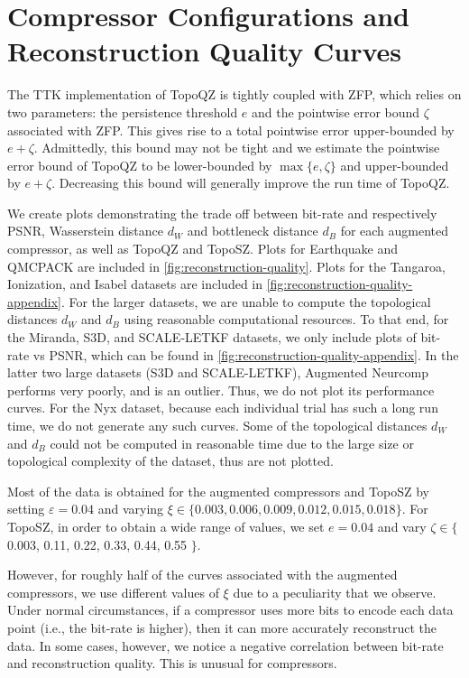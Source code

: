 \section{Compressor Configurations and Reconstruction Quality Curves}
\label{sec:reconstruction-quality-extra}

The TTK implementation of TopoQZ is tightly coupled with ZFP, which relies on two parameters: the persistence threshold $e$ and the pointwise error bound $\zeta$ associated with ZFP. 
This gives rise to a total pointwise error upper-bounded by $e+\zeta$. Admittedly, this bound may not be tight and we estimate the pointwise error bound of TopoQZ to be lower-bounded by $\max\{e, \zeta\}$ and upper-bounded by $e+\zeta$. Decreasing this bound will generally improve the run time of TopoQZ.   

We create plots demonstrating the trade off between bit-rate and respectively PSNR, Wasserstein distance $d_W$ and bottleneck distance $d_B$ for each augmented compressor, as well as TopoQZ and TopoSZ. 
Plots for Earthquake and QMCPACK are included in \cref{fig:reconstruction-quality}. Plots for the Tangaroa, Ionization, and Isabel datasets are included in \cref{fig:reconstruction-quality-appendix}. 
For the larger datasets, we are unable to compute the topological distances $d_W$ and $d_B$ using reasonable computational resources. 
To that end, for the Miranda, S3D, and SCALE-LETKF datasets, we only include plots of bit-rate vs PSNR, which can be found in \cref{fig:reconstruction-quality-appendix}. 
In the latter two large datasets (S3D and SCALE-LETKF), Augmented Neurcomp performs very poorly, and is an outlier. 
Thus, we do not plot its performance curves. 
For the Nyx dataset, because each individual trial has such a long run time, we do not generate any such curves. 
Some of the topological distances $d_W$ and $d_B$ could not be computed in reasonable time due to the large size or topological complexity of the dataset, thus are not plotted.

Most of the data is obtained for the augmented compressors and TopoSZ by setting $\varepsilon = 0.04$ and varying 
$\xi \in \{0.003, 0.006, 0.009, 0.012, 0.015, 0.018\}$. 
For TopoSZ, in order to obtain a wide range of values, we set $e = 0.04$ and vary $\zeta \in \{$ 0.003, 0.11, 0.22, 0.33, 0.44, 0.55 $\}$.

However, for roughly half of the curves associated with the augmented compressors, we use different values of $\xi$ due to a peculiarity that we observe. Under normal circumstances, if a compressor uses more bits to encode each data point (i.e., the bit-rate is higher), then it can more accurately reconstruct the data.
In some cases, however, we notice a negative correlation between bit-rate and reconstruction quality. This is unusual for compressors.

